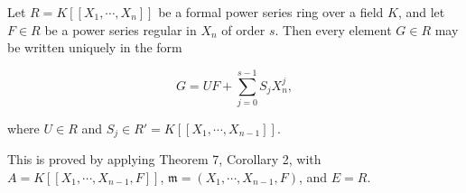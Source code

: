 Let $R = K[[X_1, \cdots, X_n]]$ be a formal power series ring over a field $K$, and let $F \in R$ be a power series regular in $X_n$ of order $s$. Then every element $G \in R$ may be written uniquely in the form

$$G = UF + \sum_{j=0}^{s-1} S_j X_n^j,$$

where $U \in R$ and $S_j \in R' = K[[X_1, \cdots, X_{n-1}]]$.

This is proved by applying Theorem 7, Corollary 2, with $A = K[[X_1, \cdots, X_{n-1}, F]]$, $\mathfrak{m} = (X_1, \cdots, X_{n-1}, F)$, and $E = R$.